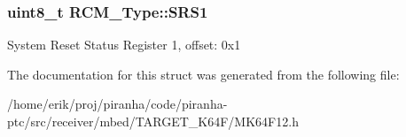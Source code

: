 \subsubsection[{\texorpdfstring{S\+R\+S1}{SRS1}}]{ uint8\+\_\+t R\+C\+M\+\_\+\+Type\+::\+S\+R\+S1}\hypertarget{structRCM__Type_a44780e402b18ebbbaec13d5a3694e523}{}\label{structRCM__Type_a44780e402b18ebbbaec13d5a3694e523}
System Reset Status Register 1, offset\+: 0x1 

The documentation for this struct was generated from the following file\+:\begin{DoxyCompactItemize}
\item 
/home/erik/proj/piranha/code/piranha-\/ptc/src/receiver/mbed/\+T\+A\+R\+G\+E\+T\+\_\+\+K64\+F/M\+K64\+F12.\+h\end{DoxyCompactItemize}
